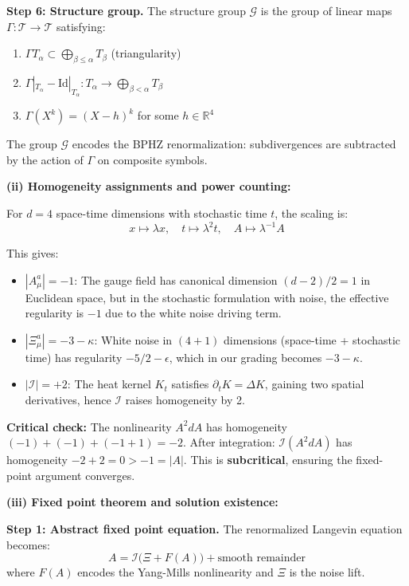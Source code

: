 \textbf{Step 6: Structure group.}
The structure group $\mathcal{G}$ is the group of linear maps $\Gamma: \mathcal{T} \to \mathcal{T}$ 
satisfying:
\begin{enumerate}
\item[(a)] $\Gamma T_\alpha \subset \bigoplus_{\beta \leq \alpha} T_\beta$ (triangularity)
\item[(b)] $\Gamma|_{T_\alpha} - \text{Id}|_{T_\alpha}: T_\alpha \to \bigoplus_{\beta < \alpha} T_\beta$
\item[(c)] $\Gamma(X^k) = (X - h)^k$ for some $h \in \mathbb{R}^4$
\end{enumerate}

The group $\mathcal{G}$ encodes the BPHZ renormalization: subdivergences are 
subtracted by the action of $\Gamma$ on composite symbols.

\textbf{(ii) Homogeneity assignments and power counting:}

For $d = 4$ space-time dimensions with stochastic time $t$, the scaling is:
\[
x \mapsto \lambda x, \quad t \mapsto \lambda^2 t, \quad A \mapsto \lambda^{-1} A
\]

This gives:
\begin{itemize}
\item $|A_\mu^a| = -1$: The gauge field has canonical dimension $(d-2)/2 = 1$ in 
Euclidean space, but in the stochastic formulation with noise, the effective 
regularity is $-1$ due to the white noise driving term.
\item $|\Xi_\mu^a| = -3 - \kappa$: White noise in $(4+1)$ dimensions (space-time + 
stochastic time) has regularity $-5/2 - \epsilon$, which in our grading becomes $-3-\kappa$.
\item $|\mathcal{I}| = +2$: The heat kernel $K_t$ satisfies $\partial_t K = \Delta K$, 
gaining two spatial derivatives, hence $\mathcal{I}$ raises homogeneity by 2.
\end{itemize}

\textbf{Critical check:} The nonlinearity $A^2 dA$ has homogeneity $(-1) + (-1) + (-1+1) = -2$. 
After integration: $\mathcal{I}(A^2 dA)$ has homogeneity $-2 + 2 = 0 > -1 = |A|$. 
This is \textbf{subcritical}, ensuring the fixed-point argument converges.

\textbf{(iii) Fixed point theorem and solution existence:}

\textbf{Step 1: Abstract fixed point equation.}
The renormalized Langevin equation becomes:
\[
A = \mathcal{I}\big(\Xi + F(A)\big) + \text{smooth remainder}
\]
where $F(A)$ encodes the Yang-Mills nonlinearity and $\Xi$ is the noise lift.


